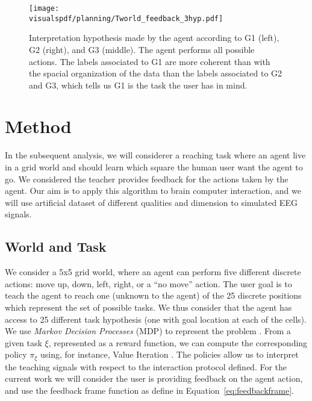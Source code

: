 \begin{figure}[H]
  \centering
  \texttt{[image: \\visualspdf/planning/Tworld\_feedback\_3hyp.pdf]}
  \caption{Interpretation hypothesis made by the agent according to G1 (left), G2 (right), and G3 (middle). The agent performs all possible actions. The labels associated to G1 are more coherent than with the spacial organization of the data than the labels associated to G2 and G3, which tells us G1 is the task the user has in mind.}
  \label{fig:planning3hyp}
\end{figure}

\section{Method}
\label{chapter:planning:method}

In the subsequent analysis, we will considerer a reaching task where an agent live in a grid world and should learn which square the human user want the agent to go. We considered the teacher provides feedback for the actions taken by the agent. Our aim is to apply this algorithm to brain computer interaction, and we will use artificial dataset of different qualities and dimension to simulated EEG signals.

\subsection{World and Task}
We consider a 5x5 grid world, where an agent can perform five different discrete actions: move up, down, left, right, or a ``no move'' action. The user goal is to teach the agent to reach one (unknown to the agent) of the 25 discrete positions which represent the set of possible tasks. We thus consider that the agent has access to 25 different task hypothesis (one with goal location at each of the cells). We use \textit{Markov Decision Processes} (MDP) to represent the problem \cite{sutton1998reinforcement}. From a given task $\xi$, represented as a reward function, we can compute the corresponding policy $\pi_{\xi}$ using, for instance, Value Iteration \cite{sutton1998reinforcement}. The policies allow us to interpret the teaching signals with respect to the interaction protocol defined. For the current work we will consider the user is providing feedback on the agent action, and use the feedback frame function as define in Equation~\ref{eq:feedbackframe}.

